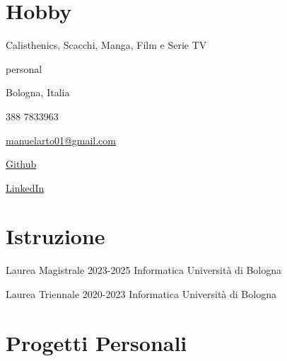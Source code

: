 \documentclass{tccv}
\begin{document}
\section{Hobby}

Calisthenics, Scacchi, Manga, Film e Serie TV

\newpage

\begin{keyvaluelist}{personal}
    \item[\faHome] Bologna, Italia
    \item[\faPhone] 388 7833963
    \item[\faEnvelope] \href{mailto:manuelarto01@gmail.com}{manuelarto01@gmail.com}
    \item[\faGithub] \href{https://github.com/manuelarto}{Github}
    \item[\faLinkedin] \href{https://www.linkedin.com/in/manuel-arto-696012203/}{LinkedIn}
\end{keyvaluelist}

\section{Istruzione}

\begin{yearlist}

\item[Laurea Magistrale]{2023-2025}
     {Informatica}
     {Università di Bologna}

\item[Laurea Triennale]{2020-2023}
    {Informatica}
    {Università di Bologna}

\end{yearlist}

\section{Progetti Personali}
\end{document}
